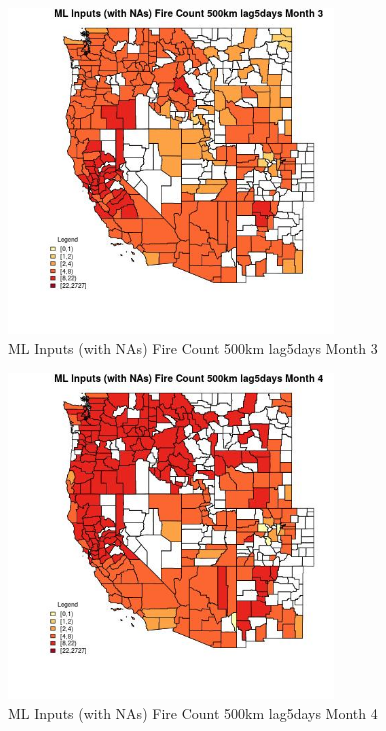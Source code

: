 \begin{figure} 
\centering  
\includegraphics[width=0.77\textwidth]{Code_Outputs/Report_ML_input_PM25_Step4_part_f_de_duplicated_aveswNAs_CountyFire_Count_500km_lag5daysmedianMonth3.jpg} 
\caption{\label{fig:Report_ML_input_PM25_Step4_part_f_de_duplicated_aveswNAsCountyFire_Count_500km_lag5daysmedianMonth3}ML Inputs (with NAs) Fire Count 500km lag5days Month 3} 
\end{figure} 
 

\begin{figure} 
\centering  
\includegraphics[width=0.77\textwidth]{Code_Outputs/Report_ML_input_PM25_Step4_part_f_de_duplicated_aveswNAs_CountyFire_Count_500km_lag5daysmedianMonth4.jpg} 
\caption{\label{fig:Report_ML_input_PM25_Step4_part_f_de_duplicated_aveswNAsCountyFire_Count_500km_lag5daysmedianMonth4}ML Inputs (with NAs) Fire Count 500km lag5days Month 4} 
\end{figure} 
 

